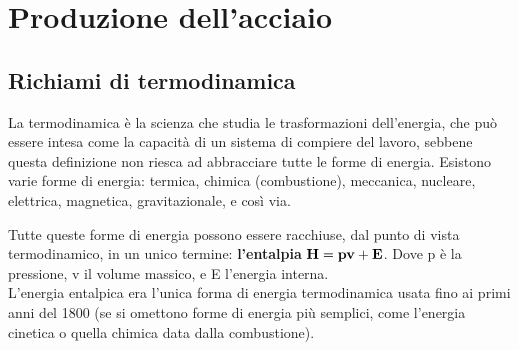 \setchapterpreamble[u]{\margintoc}
\chapter{Produzione dell'acciaio}

\section{Richiami di termodinamica}

La termodinamica è la scienza che studia le trasformazioni dell’energia, che può essere intesa come la capacità di un sistema di compiere del lavoro, sebbene questa definizione non riesca ad abbracciare tutte le forme di energia.
Esistono varie forme di energia: termica, chimica (combustione), meccanica, nucleare, elettrica, magnetica, gravitazionale, e così via.

Tutte queste forme di energia possono essere racchiuse, dal punto di vista termodinamico, in un unico termine: \textbf{l’entalpia} $\mathrm{\bold{H=pv +  E}}$. Dove p è la pressione, v il volume massico, e E l'energia interna.\\
L’energia entalpica era l’unica forma di energia termodinamica usata fino ai primi anni del 1800 (se si omettono forme di energia più semplici, come l'energia cinetica o quella chimica data dalla combustione).

